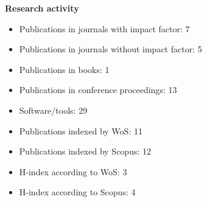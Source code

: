% 
% 

\vspace{1em}

\noindent
\textbf{Research activity}

\vspace{1.5em}

\begin{itemize}
	\item Publications in journals with impact factor: 7
	\item Publications in journals without impact factor: 5
	\item Publications in books: 1
	\item Publications in conference proceedings: 13
	\item Software/tools: 29
	\item Publications indexed by WoS: 11
	\item Publications indexed by Scopus: 12
	\item H-index according to WoS: 3
	\item H-index according to Scopus: 4
\end{itemize}

